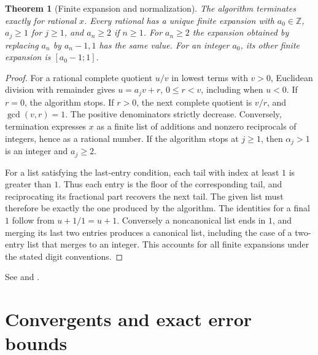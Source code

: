 \documentclass[11pt,oneside,openany]{book}
\theoremstyle{plain}
\newtheorem{theorem}{Theorem}[chapter]
\theoremstyle{definition}
\theoremstyle{remark}
\begin{document}
\begin{theorem}[Finite expansion and normalization]
The algorithm terminates exactly for rational \(x\). Every rational
has a unique finite expansion with \(a_0\in\mathbb Z\), \(a_j\ge1\) for
\(j\ge1\), and \(a_n\ge2\) if \(n\ge1\). For \(a_n\ge2\) the
expansion obtained by replacing \(a_n\) by \(a_n-1,1\) has the same
value. For an integer \(a_0\), its other finite expansion is
\([a_0-1;1]\).
\end{theorem}
\begin{proof}
For a rational complete quotient \(u/v\) in lowest terms with \(v>0\),
Euclidean division with remainder gives \(u=a_jv+r\), \(0\le r<v\),
including when \(u<0\). If \(r=0\), the algorithm stops. If \(r>0\),
the next complete quotient is \(v/r\), and \(\gcd(v,r)=1\).
The positive denominators strictly decrease. Conversely, termination
expresses \(x\) as a finite list of additions and nonzero reciprocals of
integers, hence as a rational number. If the algorithm stops at
\(j\ge1\), then \(\alpha_j>1\) is an integer and \(a_j\ge2\).

For a list satisfying the last-entry condition, each tail with index
at least \(1\) is greater than \(1\). Thus each entry is the floor of the
corresponding tail, and reciprocating its fractional part recovers the
next tail. The given list must therefore be exactly the one produced
by the algorithm. The identities for a final \(1\) follow from
\(u+1/1=u+1\). Conversely a noncanonical list ends in \(1\), and merging
its last two entries produces a canonical list, including the case
of a two-entry list that merges to an integer. This accounts for all
finite expansions under the stated digit conventions.
\end{proof}

See \cite[Chapter X]{hardy-wright} and \cite[\S\S7.1--7.3]{nzm}.

\section{Convergents and exact error bounds}
\label{nt:E03}
\end{document}

